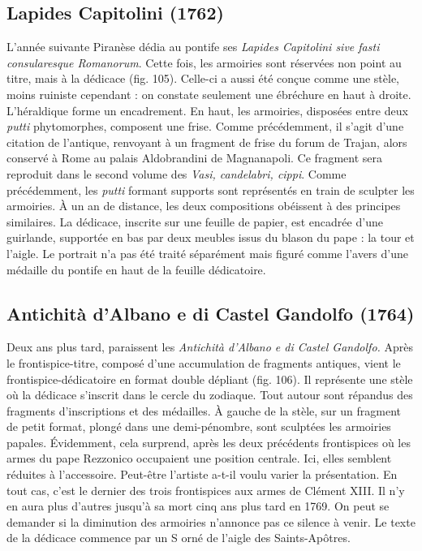 \documentclass[12pt,twoside,openany]{book}
\begin{document}
\subsection{Lapides Capitolini (1762)}

L’année suivante Piranèse dédia au pontife ses \textit{Lapides Capitolini sive fasti consularesque Romanorum}. Cette fois, les armoiries sont réservées non point au titre, mais à la dédicace (fig. 105). Celle-ci a aussi été conçue comme une stèle, moins ruiniste cependant : on constate seulement une ébréchure en haut à droite. L’héraldique forme un encadrement. En haut, les armoiries, disposées entre deux \textit{putti} phytomorphes, composent une frise. Comme précédemment, il s’agit d’une citation de l’antique, renvoyant à un fragment de frise du forum de Trajan, alors conservé à Rome au palais Aldobrandini de Magnanapoli. Ce fragment sera reproduit dans le second volume des \textit{Vasi, candelabri, cippi}. Comme précédemment, les \textit{putti} formant supports sont représentés en train de sculpter les armoiries. À un an de distance, les deux compositions obéissent à des principes similaires. La dédicace, inscrite sur une feuille de papier, est encadrée d’une guirlande, supportée en bas par deux meubles issus du blason du pape : la tour et l’aigle. Le portrait n’a pas été traité séparément mais figuré comme l’avers d’une médaille du pontife en haut de la feuille dédicatoire.

\subsection{Antichità d’Albano e di Castel Gandolfo (1764)}

Deux ans plus tard, paraissent les \textit{Antichità d’Albano e di Castel Gandolfo. }Après le frontispice-titre, composé d’une accumulation de fragments antiques, vient le frontispice-dédicatoire en format double dépliant (fig. 106). Il représente une stèle où la dédicace s’inscrit dans le cercle du zodiaque. Tout autour sont répandus des fragments d’inscriptions et des médailles. À gauche de la stèle, sur un fragment de petit format, plongé dans une demi-pénombre, sont sculptées les armoiries papales. Évidemment, cela surprend, après les deux précédents frontispices où les armes du pape Rezzonico occupaient une position centrale. Ici, elles semblent réduites à l’accessoire. Peut-être l’artiste a-t-il voulu varier la présentation. En tout cas, c’est le dernier des trois frontispices aux armes de Clément XIII. Il n’y en aura plus d’autres jusqu’à sa mort cinq ans plus tard en 1769. On peut se demander si la diminution des armoiries n’annonce pas ce silence à venir. Le texte de la dédicace commence par un S orné de l’aigle des Saints-Apôtres.
\end{document}

